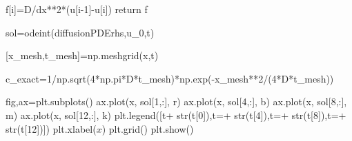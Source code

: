 \documentclass[
  letterpaper,
  DIV=11,
  numbers=noendperiod]{scrreprt}
\newenvironment{Shaded}{\begin{snugshade}}{\end{snugshade}}
\newcommand{\BuiltInTok}[1]{\textcolor[rgb]{0.00,0.23,0.31}{#1}}
\newcommand{\ControlFlowTok}[1]{\textcolor[rgb]{0.00,0.23,0.31}{#1}}
\newcommand{\DecValTok}[1]{\textcolor[rgb]{0.68,0.00,0.00}{#1}}
\newcommand{\NormalTok}[1]{\textcolor[rgb]{0.00,0.23,0.31}{#1}}
\newcommand{\OperatorTok}[1]{\textcolor[rgb]{0.37,0.37,0.37}{#1}}
\newcommand{\StringTok}[1]{\textcolor[rgb]{0.13,0.47,0.30}{#1}}
\theoremstyle{plain}
\theoremstyle{definition}
\theoremstyle{plain}
\theoremstyle{remark}
\begin{document}
\begin{Shaded}
\begin{Highlighting}[]
\NormalTok{    f[i]}\OperatorTok{=}\NormalTok{D}\OperatorTok{/}\NormalTok{dx}\OperatorTok{**}\DecValTok{2}\OperatorTok{*}\NormalTok{(u[i}\OperatorTok{{-}}\DecValTok{1}\NormalTok{]}\OperatorTok{{-}}\NormalTok{u[i])}
    \ControlFlowTok{return}\NormalTok{ f  }

\NormalTok{sol}\OperatorTok{=}\NormalTok{odeint(diffusionPDErhs,u\_0,t)}


\NormalTok{[x\_mesh,t\_mesh]}\OperatorTok{=}\NormalTok{np.meshgrid(x,t)}

\NormalTok{c\_exact}\OperatorTok{=}\DecValTok{1}\OperatorTok{/}\NormalTok{np.sqrt(}\DecValTok{4}\OperatorTok{*}\NormalTok{np.pi}\OperatorTok{*}\NormalTok{D}\OperatorTok{*}\NormalTok{t\_mesh)}\OperatorTok{*}\NormalTok{np.exp(}\OperatorTok{{-}}\NormalTok{x\_mesh}\OperatorTok{**}\DecValTok{2}\OperatorTok{/}\NormalTok{(}\DecValTok{4}\OperatorTok{*}\NormalTok{D}\OperatorTok{*}\NormalTok{t\_mesh))}

\NormalTok{fig,ax}\OperatorTok{=}\NormalTok{plt.subplots()}
\NormalTok{ax.plot(x, sol[}\DecValTok{1}\NormalTok{,:], }\StringTok{\textquotesingle{}r\textquotesingle{}}\NormalTok{)}
\NormalTok{ax.plot(x, sol[}\DecValTok{4}\NormalTok{,:], }\StringTok{\textquotesingle{}b\textquotesingle{}}\NormalTok{)}
\NormalTok{ax.plot(x, sol[}\DecValTok{8}\NormalTok{,:], }\StringTok{\textquotesingle{}m\textquotesingle{}}\NormalTok{)}
\NormalTok{ax.plot(x, sol[}\DecValTok{12}\NormalTok{,:], }\StringTok{\textquotesingle{}k\textquotesingle{}}\NormalTok{)}
\NormalTok{plt.legend([}\StringTok{\textquotesingle{}t\textquotesingle{}}\OperatorTok{+} \BuiltInTok{str}\NormalTok{(t[}\DecValTok{0}\NormalTok{]),}\StringTok{\textquotesingle{}t=\textquotesingle{}}\OperatorTok{+} \BuiltInTok{str}\NormalTok{(t[}\DecValTok{4}\NormalTok{]),}\StringTok{\textquotesingle{}t=\textquotesingle{}}\OperatorTok{+} \BuiltInTok{str}\NormalTok{(t[}\DecValTok{8}\NormalTok{]),}\StringTok{\textquotesingle{}t=\textquotesingle{}}\OperatorTok{+} \BuiltInTok{str}\NormalTok{(t[}\DecValTok{12}\NormalTok{])])}
\NormalTok{plt.xlabel(}\StringTok{\textquotesingle{}$x$\textquotesingle{}}\NormalTok{)}
\NormalTok{plt.grid()}
\NormalTok{plt.show()}


\end{Highlighting}
\end{Shaded}
\end{document}
